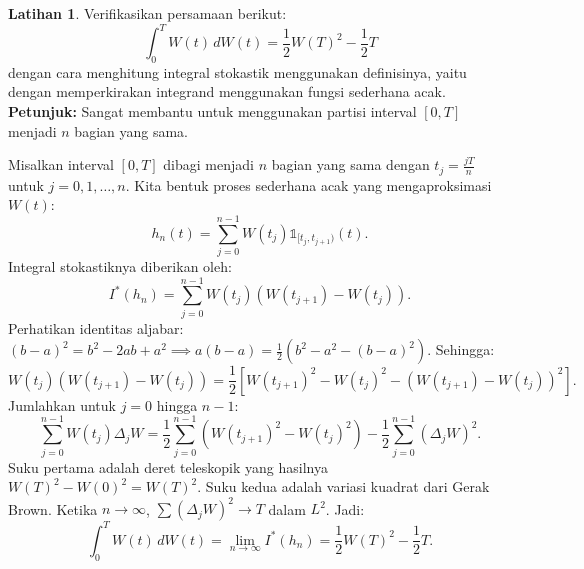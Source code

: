 \documentclass[aspectratio=169,11pt]{beamer}
\theoremstyle{definition}
\newtheorem{latihan}{Latihan}
\begin{document}
\begin{frame}{\insertsection}{\insertsubsection}
  \begin{latihan}
    Verifikasikan persamaan berikut:
    \begin{equation*}
      \int_0^T W(t) \, dW(t) = \frac{1}{2} W(T)^2 - \frac{1}{2} T
    \end{equation*}
    dengan cara menghitung integral stokastik menggunakan definisinya, yaitu dengan memperkirakan integrand menggunakan fungsi sederhana acak.
    \\ \textbf{Petunjuk:} Sangat membantu untuk menggunakan partisi interval $[0, T]$ menjadi $n$ bagian yang sama.
  \end{latihan}
\end{frame}

\begin{frame}[allowframebreaks]{\insertsection}{\insertsubsection}
  Misalkan interval $[0, T]$ dibagi menjadi $n$ bagian yang sama dengan $t_j = \frac{jT}{n}$ untuk $j = 0, 1, \dots, n$. Kita bentuk proses sederhana acak yang mengaproksimasi $W(t)$:
  \begin{equation*}
    h_n(t) = \sum_{j=0}^{n-1} W(t_j) \mathds{1}_{[t_j, t_{j+1})}(t).
  \end{equation*}
  Integral stokastiknya diberikan oleh:
  \begin{equation*}
    I^*(h_n) = \sum_{j=0}^{n-1} W(t_j) (W(t_{j+1}) - W(t_j)).
  \end{equation*}
  Perhatikan identitas aljabar: $(b-a)^2 = b^2 - 2ab + a^2 \implies a(b-a) = \frac{1}{2}(b^2 - a^2 - (b-a)^2)$. Sehingga:
  \begin{equation*}
    W(t_j)(W(t_{j+1}) - W(t_j)) = \frac{1}{2} \left[ W(t_{j+1})^2 - W(t_j)^2 - (W(t_{j+1}) - W(t_j))^2 \right].
  \end{equation*}
  Jumlahkan untuk $j=0$ hingga $n-1$:
  \begin{equation*}
    \sum_{j=0}^{n-1} W(t_j)\Delta_j W = \frac{1}{2} \sum_{j=0}^{n-1} \left( W(t_{j+1})^2 - W(t_j)^2 \right) - \frac{1}{2} \sum_{j=0}^{n-1} (\Delta_j W)^2.
  \end{equation*}
  Suku pertama adalah deret teleskopik yang hasilnya $W(T)^2 - W(0)^2 = W(T)^2$. Suku kedua adalah variasi kuadrat dari Gerak Brown. Ketika $n \to \infty$, $\sum (\Delta_j W)^2 \to T$ dalam $L^2$. Jadi:
  \begin{equation*}
    \int_0^T W(t) \, dW(t) = \lim_{n \to \infty} I^*(h_n) = \frac{1}{2} W(T)^2 - \frac{1}{2} T.
  \end{equation*}
\end{frame}
\end{document}
